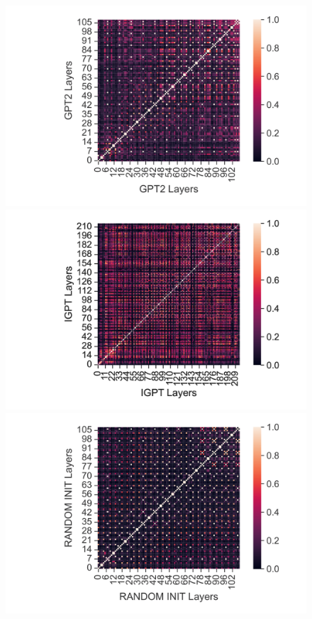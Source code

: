 \documentclass{article}
\begin{document}
\begin{figure}[H]
    \centering
    \begin{minipage}[b]{0.32\linewidth}
        \includegraphics[width=\linewidth]{figs/cka_40_40_gpt2gpt2_walker2d_medium_666_state.png}
    \end{minipage}
    \begin{minipage}[b]{0.32\linewidth}
        \includegraphics[width=\linewidth]{figs/cka_40_40_igptigpt_walker2d_medium_666_state.png}
    \end{minipage}
    \begin{minipage}[b]{0.32\linewidth}
        \includegraphics[width=\linewidth]{figs/cka_40_40_dtdt_walker2d_medium_666_state.png}

\end{minipage}
\end{figure}
\end{document}
